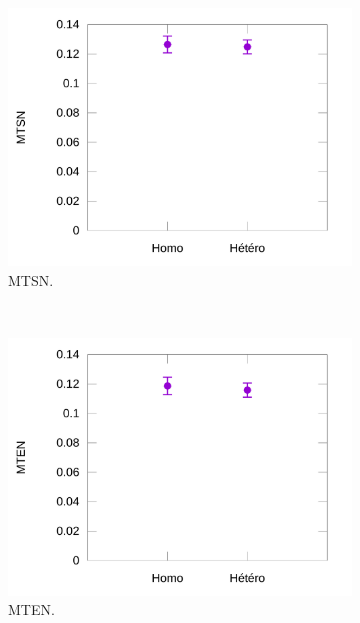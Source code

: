 	\begin{figure}[htbp]
		\begin{subfigure}[t]{0.49\textwidth}
			\centering
			\includegraphics[width=\textwidth]{figures/ch5/normAsTimes}
			\caption{MTSN.}
			\label{fig:normAsTimes}
		\end{subfigure}
		~
		\begin{subfigure}[t]{0.49\textwidth}
			\centering
			\includegraphics[width=\textwidth]{figures/ch5/normAsErrors}
			\caption{MTEN.}
			\label{fig:normAsErrors}
		\end{subfigure}
		~
		\begin{subfigure}[t]{0.49\textwidth}
			\centering

\end{subfigure}
\end{figure}
